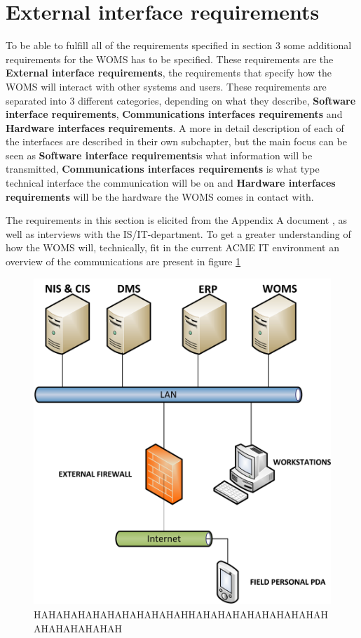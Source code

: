 \section{External interface requirements}
\label{sec:external_interface_requirements}

To be able to fulfill all of the requirements specified in section 3 some additional requirements for the WOMS has to be specified. These requirements are the \textbf{External interface requirements}, the requirements that specify how the WOMS will interact with other systems and users.  These requirements are separated into 3 different categories, depending on what they describe, \textbf{Software interface requirements}, \textbf{Communications interfaces requirements} and \textbf{Hardware interfaces requirements}. A more in detail description of each of the interfaces are described in their own subchapter, but the main focus can be seen as \textbf{Software interface requirements}is what information will be transmitted, \textbf{Communications interfaces requirements} is what type technical interface the communication will be on and \textbf{Hardware interfaces requirements} will be the hardware the WOMS comes in contact with. 

The requirements in this section is elicited from the Appendix A document \cite{}, as well as interviews with the IS/IT-department. To get a greater understanding of how the WOMS will, technically, fit in the current ACME IT environment an overview of the communications are present in figure \ref{figure:external_interfaces}

\begin{figure}[H]
	\includegraphics[width=1\textwidth]{images/external_interfaces.png}
	\caption{HAHAHAHAHAHAHAHAHAHAHHAHAHAHAHAHAHAHAHAHAHAHAHAHAHAH}
	\label{figure:external_interfaces}                      	
\end{figure}

